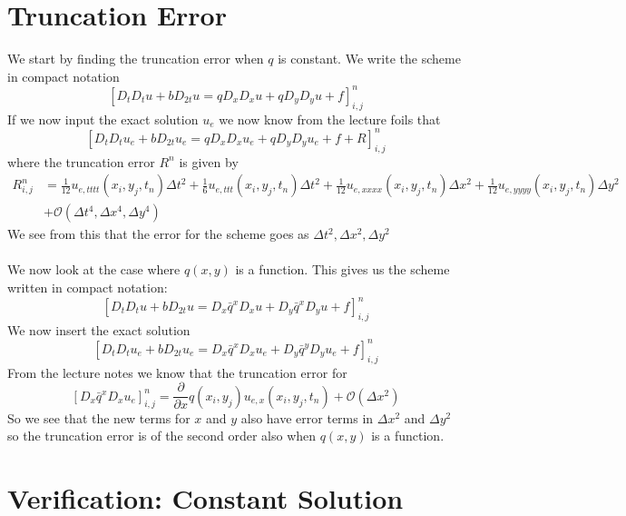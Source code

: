 \documentclass[12pt, norsk, a4paper]{article}
\begin{document}
\section*{Truncation Error}
We start by finding the truncation error when $q$ is constant.
We write the scheme in compact notation
\[\left[D_tD_tu + b D_{2t}u = qD_xD_xu + qD_yD_yu + f\right]_{i,j}^n\]
If we now input the exact solution $u_e$ we now know from the lecture foils that 
\[\left[D_tD_tu_e + bD_{2t}u_e = qD_xD_xu_e+qD_yD_yu_e + f + R\right]_{i,j}^n\]
where the truncation error $R^n$ is given by
\begin{align*}
R_{i,j}^n &= \frac{1}{12}u_{e,tttt}(x_i,y_j,t_n) \Delta t^2 +
\frac{1}{6}u_{e,ttt}(x_i,y_j,t_n)\Delta t^2 +
\frac{1}{12}u_{e,xxxx}(x_i,y_j,t_n)\Delta x^2 +
\frac{1}{12}u_{e,yyyy}(x_i,y_j,t_n)\Delta y^2 \\ 
& + \mathcal{O}(\Delta t^4, \Delta x^4, \Delta y^4)
\end{align*}
We see from this that the error for the scheme goes as $\Delta t^2, \Delta x^2,
   \Delta y^2$ \\ \\
We now look at the case where $q(x,y)$ is a function.
This gives us the scheme written in compact notation:
\[\left[D_tD_tu + b D_{2t}u = D_x\bar{q}^{x}D_xu + D_y\bar{q}^xD_yu + f\right]_{i,j}^n\]
We now insert the exact solution
\[\left[D_tD_tu_e + b D_{2t}u_e = D_x\bar{q}^{x}D_xu_e + D_y\bar{q}^yD_yu_e + f\right]_{i,j}^n\]
From the lecture notes we know that the truncation error for
\[\left[D_x\bar{q}^xD_xu_e\right]_{i,j}^n = \frac{\partial}{\partial x}
q(x_i,y_j)u_{e,x}(x_i,y_j,t_n) + \mathcal{O}(\Delta x^2)\]
So we see that the new terms for $x$ and $y$ also have error terms  in $\Delta
x^2$ and $\Delta y^2$ so the truncation error is of the second order also when
$q(x,y)$ is a function.
\section*{Verification: Constant Solution}
\end{document}
